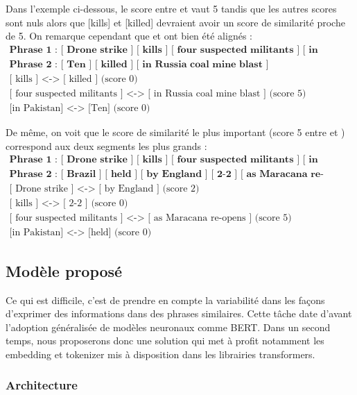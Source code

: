 \documentclass[a4paper, twoside, 11pt]{article}
\begin{document}
Dans l'exemple ci-dessous, le score entre  \fg{} et   \fg{} vaut 5 tandis que les autres scores sont nuls alors que [kills] et [killed] devraient avoir un score de similarité proche de 5. On remarque cependant que \og [ kills ] \fg{} et \og [ killed ] \fg{} ont bien été alignés :
\begin{eqnarray*}
\textbf{Phrase 1 : [ Drone strike ] [ kills ] [ four suspected militants ] [ in Pakistan ]}\\
\textbf{Phrase 2 : [ Ten ] [ killed ] [ in Russia coal mine blast ]}\\
\textrm{[ kills ] <-> [ killed ] (score 0)}\\
\textrm{[ four suspected militants ] <-> [ in Russia coal mine blast ] (score 5)}\\
\textrm{[in Pakistan] <-> [Ten] (score 0)}
\end{eqnarray*}


De même, on voit que le score de similarité le plus important (score 5 entre  \fg{} et \fg{}) correspond aux deux segments les plus grands :
\begin{eqnarray*}
\textbf{Phrase 1 : [ Drone strike ] [ kills ] [ four suspected militants ] [ in Pakistan ]}\\
\textbf{Phrase 2 : [ Brazil ] [ held ] [ by England ] [ 2-2 ] [ as Maracana re-opens ]}\\
\textrm{[ Drone strike ] <-> [ by England ] (score 2)}\\
\textrm{[ kills ] <-> [ 2-2 ] (score 0)}\\
\textrm{[ four suspected militants ] <-> [ as Maracana re-opens ] (score 5)}\\
\textrm{[in Pakistan] <-> [held] (score 0)}
\end{eqnarray*}

    \subsection{Modèle proposé}
     Ce qui est difficile, c’est de prendre en compte la variabilité dans les façons d’exprimer des informations dans des phrases similaires. Cette tâche date d’avant l’adoption généralisée de modèles neuronaux comme BERT. Dans un second temps, nous proposerons donc une solution qui met à profit notamment les embedding et tokenizer mis à disposition dans les librairies transformers.

 \subsubsection{Architecture}
\end{document}
